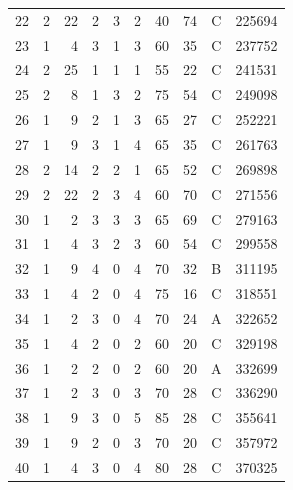 \documentclass[10pt]{article}
\begin{document}
\begin{table}[H]
{\begin{tabular}{|r|r|r|r|r|r|r|r|c|r|}
        22 & 2 & 22 & 2 & 3 & 2 & 40 & 74 & C & 225694 \\
        23 & 1 & 4 & 3 & 1 & 3 & 60 & 35 & C & 237752 \\
        24 & 2 & 25 & 1 & 1 & 1 & 55 & 22 & C & 241531 \\
        25 & 2 & 8 & 1 & 3 & 2 & 75 & 54 & C & 249098 \\
        26 & 1 & 9 & 2 & 1 & 3 & 65 & 27 & C & 252221 \\
        27 & 1 & 9 & 3 & 1 & 4 & 65 & 35 & C & 261763 \\
        28 & 2 & 14 & 2 & 2 & 1 & 65 & 52 & C & 269898 \\
        29 & 2 & 22 & 2 & 3 & 4 & 60 & 70 & C & 271556 \\
        30 & 1 & 2 & 3 & 3 & 3 & 65 & 69 & C & 279163 \\
        31 & 1 & 4 & 3 & 2 & 3 & 60 & 54 & C & 299558 \\
        32 & 1 & 9 & 4 & 0 & 4 & 70 & 32 & B & 311195 \\
        33 & 1 & 4 & 2 & 0 & 4 & 75 & 16 & C & 318551 \\
        34 & 1 & 2 & 3 & 0 & 4 & 70 & 24 & A & 322652 \\
        35 & 1 & 4 & 2 & 0 & 2 & 60 & 20 & C & 329198 \\
        36 & 1 & 2 & 2 & 0 & 2 & 60 & 20 & A & 332699 \\
        37 & 1 & 2 & 3 & 0 & 3 & 70 & 28 & C & 336290 \\
        38 & 1 & 9 & 3 & 0 & 5 & 85 & 28 & C & 355641 \\
        39 & 1 & 9 & 2 & 0 & 3 & 70 & 20 & C & 357972 \\
        40 & 1 & 4 & 3 & 0 & 4 & 80 & 28 & C & 370325 \\
        \hline
    \end{tabular}%
    }
\end{table}
\end{document}
